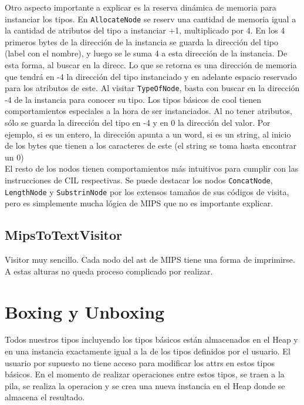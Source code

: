 \documentclass[a4paper,12pt]{article}
\def\code#1{\texttt{#1}}
\begin{document}
Otro aspecto importante a explicar es la reserva dinámica de memoria para instanciar los tipos. En \code{AllocateNode} se reserv una cantidad de memoria igual a la cantidad de atributos del tipo a instanciar +1, multiplicado por 4. En los 4 primeros bytes de la dirección de la instancia se guarda la dirección del tipo (label con el nombre), y luego se le suma 4 a esta dirección de la instancia. De esta forma, al buscar en la direcc. Lo que se retorna es una dirección de memoria que tendrá en -4 la dirección del tipo instanciado y en adelante espacio reservado para los atributos de este. Al visitar \code{TypeOfNode}, basta con buscar en la dirección -4 de la instancia para conocer su tipo. Los tipos básicos de cool tienen comportamientos especiales a la hora de ser instanciados. Al no tener atributos, sólo se guarda la dirección del tipo en -4 y en 0 la dirección del valor. Por ejemplo, si es un entero, la dirección apunta a un word, si es un string, al inicio de los bytes que tienen a los caracteres de este (el string se toma hasta encontrar un 0)\\

El resto de los nodos tienen comportamientos más intuitivos para cumplir con las instrucciones de CIL respectivas. Se puede destacar los nodos \code{ConcatNode}, \code{LengthNode} y \code{SubstrinNode} por los extensos tamaños de sus códigos de visita, pero es simplemente mucha lógica de MIPS que no es importante explicar.

\subsection*{MipsToTextVisitor}
Visitor muy sencillo. Cada nodo del ast de MIPS tiene una forma de imprimirse. A estas alturas no queda proceso complicado por realizar.

\section*{Boxing y Unboxing}
Todos nuestros tipos incluyendo los tipos básicos están almacenados en el Heap y en una instancia exactamente igual a la de los tipos definidos por el usuario. El usuario por supuesto no tiene acceso para modificar los attrs en estos tipos básicos. En el momento de realizar operaciones entre estos tipos, se traen a la pila, se realiza la operacion y se crea una nueva instancia en el Heap donde se almacena el resultado.
\end{document}

